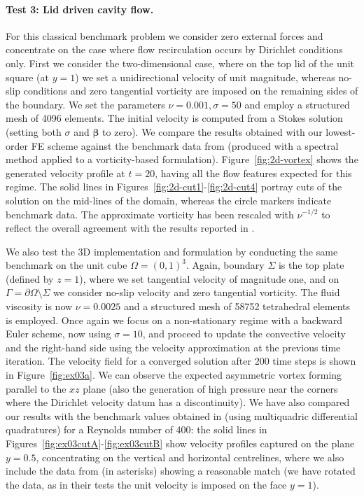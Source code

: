 \documentclass[reqno,a4paper]{article}
\numberwithin{equation}{section}
\newcommand\bbbeta{\boldsymbol{\beta}}
\begin{document}
\paragraph{Test 3: Lid driven cavity flow.} For this classical 
benchmark problem we consider zero external forces and concentrate on 
the case where flow recirculation occurs by Dirichlet conditions only. 
First we consider the two-dimensional case, where on the top lid of the 
unit square (at $y=1$) we set a unidirectional  velocity of 
unit magnitude, whereas no-slip conditions and zero tangential vorticity 
are imposed on the remaining sides of the boundary.  We set the 
parameters $\nu =0.001,\sigma =50$ 
and employ a structured mesh of 4096 elements. The initial velocity is 
computed from a Stokes solution (setting both $\sigma$ and $\bbbeta$ to zero). 
 We compare the results obtained with  
our lowest-order FE scheme against the benchmark data from \cite{botella98} (produced with a 
spectral method applied to a vorticity-based formulation). Figure~\ref{fig:2d-vortex} 
shows the generated velocity profile at $t=20$, having all the flow features expected 
for this regime. The solid lines in Figures~\ref{fig:2d-cut1}-\ref{fig:2d-cut4} portray cuts of the 
solution on the mid-lines of the domain, whereas the circle markers indicate benchmark data. 
The approximate vorticity has been rescaled with 
$\nu^{-1/2}$ to reflect the overall agreement with the results reported in \cite{botella98}.   

We also test the 3D implementation and formulation by conducting the same 
benchmark on the unit cube $\Omega = (0,1)^3$. Again, boundary $\Sigma$ is the 
top plate (defined by $z=1$), where we set tangential velocity of magnitude one, and on 
$\Gamma=\partial\Omega\setminus\Sigma$ we consider no-slip velocity and 
zero tangential vorticity. The fluid viscosity is now  
$\nu = 0.0025$ and a structured mesh of 58752 tetrahedral elements is employed. 
Once again we focus on a non-stationary regime with 
a backward Euler scheme, now using $\sigma = 10$, and proceed to update the convective 
velocity and the right-hand side using the velocity approximation at the 
previous time iteration. The velocity field for a converged solution after 200 time steps is 
shown in Figure~\ref{fig:ex03a}. We can observe the expected asymmetric 
vortex forming parallel to the $xz$ plane (also the generation of high pressure 
near the corners where the Dirichlet velocity datum has 
a discontinuity). We have also compared our results with the benchmark values obtained 
in \cite{ding06} (using  multiquadric differential quadratures) 
for a Reynolds number of 400: the solid lines in Figures~\ref{fig:ex03cutA}-\ref{fig:ex03cutB} 
show velocity profiles captured on the plane $y=0.5$, concentrating on the vertical and 
horizontal centrelines, where we also include the data from \cite{ding06} (in asterisks) 
showing a reasonable match (we have rotated the data, as in their tests the 
unit velocity is imposed on the face $y=1$). 
\end{document}

